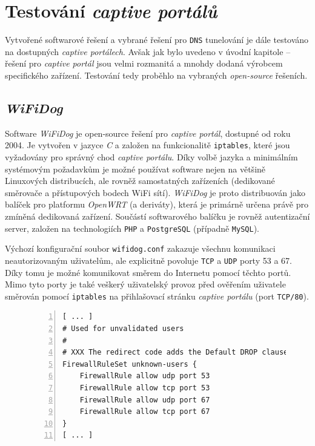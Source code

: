\documentclass[thesis=M,czech]{FITthesis}[2012/10/20]
\begin{document}
    
\section{Testování \textit{captive portálů}}

Vytvořené softwarové řešení a vybrané řešení pro \texttt{DNS} tunelování je dále testováno na dostupných \textit{captive portálech}. Avšak jak bylo uvedeno v úvodní kapitole -- řešení pro \textit{captive portál} jsou velmi rozmanitá a mnohdy dodaná výrobcem specifického zařízení. Testování tedy proběhlo na vybraných \textit{open-source} řešeních.

\subsection{\textit{WiFiDog}}

Software \textit{WiFiDog} je open-source řešení pro \textit{captive portál}, dostupné od roku 2004. Je vytvořen v jazyce \textit{C} a založen na funkcionalitě \texttt{iptables}, které jsou vyžadovány pro správný chod \textit{captive portálu}. Díky volbě jazyka a minimálním systémovým požadavkům je možné používat software nejen na většině Linuxových distribucích, ale rovněž samostatných zařízeních (dedikované směrovače a přístupových bodech WiFi sítí). \textit{WiFiDog} je proto distribuován jako balíček pro platformu \textit{OpenWRT} (a deriváty), která je primárně určena právě pro zmíněná dedikovaná zařízení. Součástí softwarového balíčku je rovněž autentizační server, založen na technologiích \texttt{PHP} a \texttt{PostgreSQL} (případně \texttt{MySQL}).

Výchozí konfigurační soubor \texttt{wifidog.conf} zakazuje všechnu komunikaci neautorizovaným uživatelům, ale explicitně povoluje \texttt{TCP} a \texttt{UDP} porty 53 a 67. Díky tomu je možné komunikovat směrem do Internetu pomocí těchto portů. Mimo tyto porty je také veškerý uživatelský provoz před ověřením uživatele směrován pomocí \texttt{iptables} na přihlašovací stránku \textit{captive portálu} (port \texttt{TCP/80}).

    \begin{figure}[h]
	\begin{lstlisting}[label=code:iperf,caption=Část výchozího konfiguračního souboru captive portálu WiFiDog,frame=single,numbers=left]
[ ... ]
# Used for unvalidated users
#
# XXX The redirect code adds the Default DROP clause.
FirewallRuleSet unknown-users {
    FirewallRule allow udp port 53
    FirewallRule allow tcp port 53
    FirewallRule allow udp port 67
    FirewallRule allow tcp port 67
}
[ ... ]
      \end{lstlisting}
    \end{figure}
\end{document}
